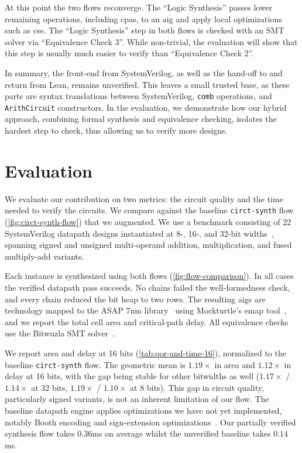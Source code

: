 \documentclass[conference]{IEEEtran}
\newcommand{\geoAreaThirtyTwo}{1.17}
\newcommand{\geoDelayThirtyTwo}{1.14}
\newcommand{\geoAreaSixteen}{1.19}
\newcommand{\geoDelaySixteen}{1.12}
\newcommand{\geoAreaEight}{1.19}
\newcommand{\geoDelayEight}{1.10}
\newcommand{\synthGeoBaseline}{0.14}
\newcommand{\synthGeoOurs}{0.36}
\theoremstyle{plain}
\theoremstyle{definition}
\begin{document}
At this point the two flows reconverge.
The ``Logic Synthesis'' passes lower remaining operations, including \acp{cpa}, to an \ac{aig} and 
apply local optimizations such as \ac{cse}.
The ``Logic Synthesis'' step in both flows is checked with an SMT solver via ``Equivalence Check 3''.
While non-trivial, the evaluation will show that this step is usually much easier to verify than ``Equivalence Check 2''.

In summary, the front-end from SystemVerilog, as well as the hand-off to and return from Lean, remains unverified.
This leaves a small trusted base, as these parts are syntax translations between
SystemVerilog, \texttt{comb} operations, and \texttt{ArithCircuit} constructors.
In the evaluation, we demonstrate how our hybrid approach, combining formal synthesis and equivalence checking, isolates
the hardest step to check, thus allowing us to verify more designs.

\section{Evaluation}\label{sec:evaluation}
We evaluate our contribution on two metrics: the circuit quality and the time needed to verify the circuits.
We compare against the baseline \texttt{circt-synth} flow (\autoref{fig:circt-synth-flow}) that we augmented.
We use a benchmark consisting of 22 SystemVerilog datapath designs instantiated at 8-, 16-, and 32-bit widths~\cite{datapath_bench},
spanning signed and unsigned multi-operand addition, multiplication, and fused multiply-add variants.

Each instance is synthesized using both flows (\autoref{fig:flow-comparison}).
In all cases the verified datapath pass succeeds. No chains failed the well-formedness check, and every chain reduced the bit heap to two rows.
The resulting \acp{aig} are technology mapped to the ASAP 7nm library~\cite{asap7} using Mockturtle's emap tool~\cite{Calvino2023TechnologyCells}, and we report the total cell area and critical-path delay.
All equivalence checks use the Bitwuzla SMT solver~\cite{bitwuzla}.
  
We report area and delay at 16 bits (\autoref{tab:qor-and-time-16}), normalized to the baseline \texttt{circt-synth} flow.
The geometric mean is $\geoAreaSixteen\times$ in area and $\geoDelaySixteen\times$ in delay at 16 bits,
with the gap being stable for other bitwidths as well ($\geoAreaThirtyTwo\times$ / $\geoDelayThirtyTwo\times$ at 32 bits, $\geoAreaEight\times$ / $\geoDelayEight\times$ at 8 bits).
This gap in circuit quality, particularly signed variants, is not an inherent limitation of our flow.
The baseline datapath engine applies optimizations we have not yet implemented, notably Booth encoding and sign-extension optimizations~\cite{application_specific_arithmetic}. 
Our partially verified synthesis flow takes $\synthGeoOurs$ms on average whilst the unverified baseline takes $\synthGeoBaseline$ms.
\end{document}
